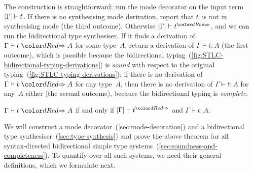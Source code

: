 The construction is straightforward:
run the mode decorator on the input term~$\left|\Gamma\right| \vdash t$.
If there is no synthesising mode derivation, report that $t$~is not in synthesising mode (the third outcome).
Otherwise $\erase\Gamma \vdash t^{\syn}$, and we can run the bidirectional type synthesiser.
If it finds a derivation of $\Gamma \vdash t \syn A$ for some type~$A$, return a derivation of $\Gamma \vdash t : A$ (the first outcome), which is possible because the bidirectional typing~(\cref{fig:STLC-bidirectional-typing-derivations}) is \emph{sound} with respect to the original typing~(\cref{fig:STLC-typing-derivations}); if there is no derivation of $\Gamma \vdash t \syn A$ for any type~$A$, then there is no derivation of $\Gamma \vdash t : A$ for any~$A$ either (the second outcome), because the bidirectional typing is \emph{complete}:
\begin{theorem}
$\Gamma \vdash t \syn A$ if and only if\/ $\erase\Gamma \vdash t^{\syn}$ and\/ $\Gamma \vdash t : A$.
\end{theorem}
%
%

We will construct a mode decorator~(\cref{sec:mode-decoration}) and a bidirectional type synthesiser~(\cref{sec:type-synthesis}) and prove the above theorem for all syntax-directed bidirectional simple type systems~(\cref{sec:soundness-and-completeness}).
To quantify over all such systems, we need their general definitions, which we formulate next.

